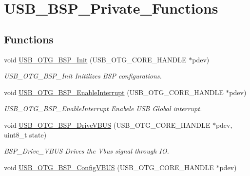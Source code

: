 \hypertarget{group__USB__BSP__Private__Functions}{\section{U\-S\-B\-\_\-\-B\-S\-P\-\_\-\-Private\-\_\-\-Functions}
\label{group__USB__BSP__Private__Functions}
}
\subsection*{Functions}
\begin{DoxyCompactItemize}
\item 
void \hyperlink{group__USB__BSP__Private__Functions_gacffb89e4346b11dee704fe5a40326a1f}{U\-S\-B\-\_\-\-O\-T\-G\-\_\-\-B\-S\-P\-\_\-\-Init} (U\-S\-B\-\_\-\-O\-T\-G\-\_\-\-C\-O\-R\-E\-\_\-\-H\-A\-N\-D\-L\-E $\ast$pdev)
\begin{DoxyCompactList}\small\item\em U\-S\-B\-\_\-\-O\-T\-G\-\_\-\-B\-S\-P\-\_\-\-Init Initilizes B\-S\-P configurations. \end{DoxyCompactList}\item 
void \hyperlink{group__USB__BSP__Private__Functions_ga38bdd94d09d00f27d1343fdb0babdfa1}{U\-S\-B\-\_\-\-O\-T\-G\-\_\-\-B\-S\-P\-\_\-\-Enable\-Interrupt} (U\-S\-B\-\_\-\-O\-T\-G\-\_\-\-C\-O\-R\-E\-\_\-\-H\-A\-N\-D\-L\-E $\ast$pdev)
\begin{DoxyCompactList}\small\item\em U\-S\-B\-\_\-\-O\-T\-G\-\_\-\-B\-S\-P\-\_\-\-Enable\-Interrupt Enabele U\-S\-B Global interrupt. \end{DoxyCompactList}\item 
void \hyperlink{group__USB__BSP__Private__Functions_ga1a0b196001899cd61bc722d080ca8161}{U\-S\-B\-\_\-\-O\-T\-G\-\_\-\-B\-S\-P\-\_\-\-Drive\-V\-B\-U\-S} (U\-S\-B\-\_\-\-O\-T\-G\-\_\-\-C\-O\-R\-E\-\_\-\-H\-A\-N\-D\-L\-E $\ast$pdev, uint8\-\_\-t state)
\begin{DoxyCompactList}\small\item\em B\-S\-P\-\_\-\-Drive\-\_\-\-V\-B\-U\-S Drives the Vbus signal through I\-O. \end{DoxyCompactList}\item 
void \hyperlink{group__USB__BSP__Private__Functions_ga02dee21bb9a092415782c0e1a460981c}{U\-S\-B\-\_\-\-O\-T\-G\-\_\-\-B\-S\-P\-\_\-\-Config\-V\-B\-U\-S} (U\-S\-B\-\_\-\-O\-T\-G\-\_\-\-C\-O\-R\-E\-\_\-\-H\-A\-N\-D\-L\-E $\ast$pdev)

\end{DoxyCompactItemize}
